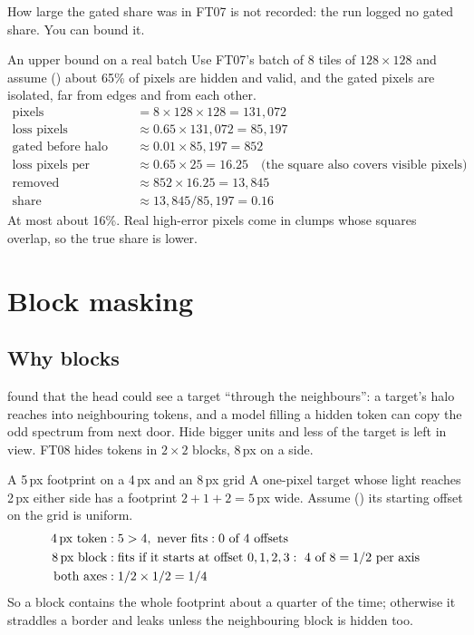 How large the gated share was in FT07 is not recorded: the run logged no gated share. You can bound it.

\begin{worked}[label={we:decoderwork:tile}]{An upper bound on a real batch}
Use FT07's batch of 8 tiles of $128\times128$ and assume (\tagA) about 65\% of pixels are hidden and valid, and
the gated pixels are isolated, far from edges and from each other.
\begin{align*}
\text{pixels} &= 8\times128\times128 = 131{,}072\\
\text{loss pixels} &\approx 0.65\times131{,}072 = 85{,}197\\
\text{gated before halo} &\approx 0.01\times85{,}197 = 852\\
\text{loss pixels per square} &\approx 0.65\times25 = 16.25\quad\text{(the square also covers visible pixels)}\\
\text{removed} &\approx 852\times16.25 = 13{,}845\\
\text{share} &\approx 13{,}845/85{,}197 = 0.16
\end{align*}
At most about 16\%. Real high-error pixels come in clumps whose squares overlap, so the true share is lower.
\end{worked}

\section{Block masking}\label{sec:decoderwork:blocks}

\subsection{Why blocks}

 found that the head could see a target ``through the neighbours'': a target's halo
reaches into neighbouring tokens, and a model filling a hidden token can copy the odd spectrum from next door.
Hide bigger units and less of the target is left in view. FT08 hides tokens in $2\times2$ blocks, 8\,px on a
side.

\begin{worked}[label={we:decoderwork:footprint}]{A 5\,px footprint on a 4\,px and an 8\,px grid}
A one-pixel target whose light reaches 2\,px either side has a footprint $2+1+2=5$\,px wide. Assume (\tagA) its
starting offset on the grid is uniform.
\begin{align*}
\text{4\,px token} &: 5>4,\ \text{never fits}: 0 \text{ of } 4 \text{ offsets}\\
\text{8\,px block} &: \text{fits if it starts at offset } 0,1,2,3:\ 4 \text{ of } 8 = 1/2 \text{ per axis}\\
\text{both axes} &: 1/2\times1/2 = 1/4
\end{align*}
So a block contains the whole footprint about a quarter of the time; otherwise it straddles a border and
leaks unless the neighbouring block is hidden too.
\end{worked}

